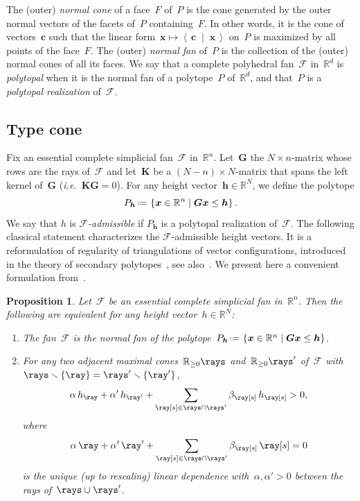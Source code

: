 \documentclass{amsart}
\newtheorem{proposition}[theorem]{Proposition}
\theoremstyle{definition}
\newcommand{\R}{\mathbb{R}} %
\renewcommand{\b}[1]{{\boldsymbol{#1}}} %
\newcommand{\set}[2]{\left\{ #1 \;\middle|\; #2 \right\}} %
\newcommand{\ssm}{\smallsetminus} %
\newcommand{\dotprod}[2]{\left\langle \, #1 \; \middle| \; #2 \, \right\rangle} %
\newcommand{\eqdef}{\mbox{\,\raisebox{0.2ex}{\scriptsize\ensuremath{\mathrm:}}\ensuremath{=}\,}} %
\newcommand{\ie}{\textit{i.e.}~} %
\newcommand{\darkblue}{\color{darkblue}} %
\newcommand{\defn}[1]{\textsl{\darkblue #1}} %
\newcommand{\Fan}{\mathcal{F}} %
\begin{document}
The (outer) \defn{normal cone} of a face~$F$ of~$P$ is the cone generated by the outer normal vectors of the facets of~$P$ containing~$F$.
In other words, it is the cone of vectors~$\b{c}$ such that the linear form~${\b{x} \mapsto \dotprod{\b{c}}{\b{x}}}$ on~$P$ is maximized by all points of the face~$F$.
The (outer) \defn{normal fan} of~$P$ is the collection of the (outer) normal cones of all its faces.
We say that a complete polyhedral fan~$\Fan$ in~$\R^d$ is \defn{polytopal} when it is the normal fan of a polytope~$P$ of~$\R^d$, and that~$P$ is a \defn{polytopal realization} of~$\Fan$.


\subsection{Type cone}

Fix an essential complete simplicial fan~$\Fan$ in~$\R^n$. Let~$\b{G}$ the $N \times n$-matrix whose rows are the rays of~$\Fan$ and let~$\b{K}$ be a $(N-n) \times N$-matrix that spans the left kernel of~$\b{G}$ (\ie $\b{K}\b{G} = 0$). For any height vector~$\b{h} \in \R^N$, we define the polytope
\[
P_\b{h} \eqdef \set{\b{x} \in \R^n}{\b{G}\b{x} \le \b{h}}.
\]
We say that $h$ is \defn{$\Fan$-admissible} if $P_\b{h}$ is a polytopal realization of~$\Fan$.
The following classical statement characterizes the $\Fan$-admissible height vectors.
It is a reformulation of regularity of triangulations of vector configurations, introduced in the theory of secondary polytopes~\cite{GelfandKapranovZelevinsky}, see also~\cite{DeLoeraRambauSantos}.
We present here a convenient formulation from~\cite[Lem.~2.1]{ChapotonFominZelevinsky}.

\begin{proposition}
\label{prop:characterizationPolytopalFan}
Let~$\Fan$ be an essential complete simplicial fan in~$\R^n$. Then the following are equivalent for any height vector~$h \in \R^N$:
\begin{enumerate}
\item The fan~$\Fan$ is the normal fan of the polytope~$P_\b{h} \eqdef \set{\b{x} \in \R^n}{\b{G}\b{x} \le \b{h}}$.
\item For any two adjacent maximal cones~$\R_{\ge0}\rays$ and~$\R_{\ge0}\rays'$ of~$\Fan$ with~$\rays \ssm \{\ray\} = \rays' \ssm \{\ray'\}$,
\[
\alpha \, h_{\ray} + \alpha' \, h_{\ray'} + \sum_{\ray[s] \in \rays \cap \rays'} \beta_{\ray[s]} \, h_{\ray[s]} > 0,
\]
where
\[
\alpha \, \ray + \alpha' \, \ray' + \sum_{\ray[s] \in \rays \cap \rays'} \beta_{\ray[s]} \, \ray[s] = 0
\]
is the unique (up to rescaling) linear dependence with~$\alpha, \alpha' > 0$ between the rays of~$\rays \cup \rays'$.
\end{enumerate}
\end{proposition}
\end{document}
